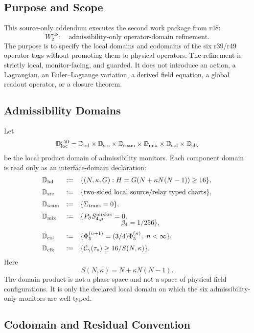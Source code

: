\subsection{Purpose and Scope}
\label{subsec:r50-purpose-scope}

This source-only addendum executes the second work package from r48:
\[
\boxed{W_2^{r48}:\quad \text{admissibility-only operator-domain refinement}.}
\]
The purpose is to specify the local domains and codomains of the six r39/r49
operator tags without promoting them to physical operators.  The refinement is
strictly local, monitor-facing, and guarded.  It does not introduce an action,
a Lagrangian, an Euler--Lagrange variation, a derived field equation, a global
readout operator, or a closure theorem.

\subsection{Admissibility Domains}
\label{subsec:r50-admissibility-domains}

Let
\[
\mathbb D_{\rm loc}^{r50}
=
\mathbb D_{\rm bd}
\times
\mathbb D_{\rm src}
\times
\mathbb D_{\rm seam}
\times
\mathbb D_{\rm mix}
\times
\mathbb D_{\rm col}
\times
\mathbb D_{\rm clk}
\]
be the local product domain of admissibility monitors.  Each component domain is
read only as an interface-domain declaration:
\[
\begin{array}{lll}
\mathbb D_{\rm bd}   &:=& \{(N,\kappa,G):H=G(N+\kappa N(N-1))\ge 16\},\\[2mm]
\mathbb D_{\rm src}  &:=& \{\text{two-sided local source/relay typed charts}\},\\[2mm]
\mathbb D_{\rm seam} &:=& \{\Sigma_{\rm trans}=0\},\\[2mm]
\mathbb D_{\rm mix}  &:=& \{P_{\partial}S_{4,\mu}^{\rm mixker}=0,\\[-1mm]
&&\hspace{21mm}\beta_4=1/256\},\\[2mm]
\mathbb D_{\rm col}  &:=& \{\Phi_5^{(n+1)}=(3/4)\Phi_5^{(n)},\ n<\infty\},\\[2mm]
\mathbb D_{\rm clk}  &:=& \{\mathcal C_{\gamma}(\tau_v)\ge 16/S(N,\kappa)\}.
\end{array}
\]
Here
\[
S(N,\kappa)=N+\kappa N(N-1).
\]
The domain product is not a phase space and not a space of physical field
configurations.  It is only the declared local domain on which the six
admissibility-only monitors are well-typed.

\subsection{Codomain and Residual Convention}
\label{subsec:r50-codomain-residual-convention}

